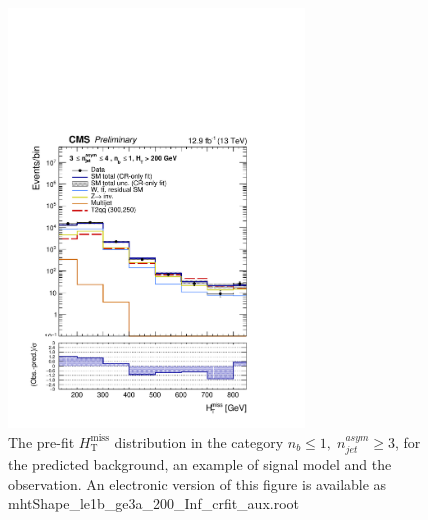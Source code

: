 \clearpage
\begin{figure}[tbhp]
    \caption{ 
    The pre-fit $H_{\mathrm{T}}^{\mathrm{miss}}$ distribution in the category $n_{b}\leq 1, \; n_{jet}^{asym} \geq 3$, 
    for the predicted background, an example of signal model and the observation.
    An electronic version of this figure is available as mhtShape\_le1b\_ge3a\_200\_Inf\_crfit\_aux.root
    \label{fig:mhtShape_le1b_ge3a_crfit} }
  \begin{center}
  \includegraphics[width=0.7\textwidth]{mhtShape_le1b_ge3a_200_Inf_crfit_aux}
  \end{center}
\end{figure}


